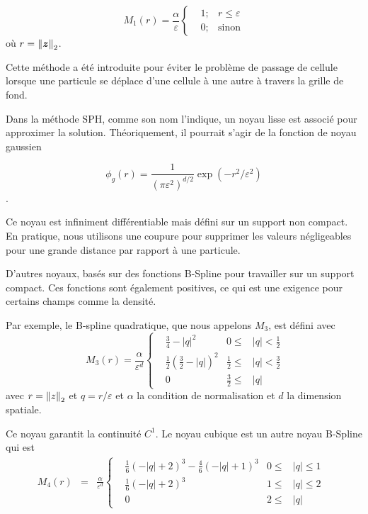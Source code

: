 \begin{equation*}
    M_1(r) = \frac{\alpha}{\varepsilon}\left\{\begin{aligned}
         & 1; & r \leq \varepsilon \\
         & 0; & \text{sinon}
    \end{aligned}
    \right.
\end{equation*}où $r = \left\lVert \bm{z} \right\rVert_2$.

Cette méthode a été introduite pour éviter le problème de passage de cellule lorsque une particule se déplace d'une cellule à une autre à travers la grille de fond.

Dans la méthode SPH, comme son nom l'indique, un noyau lisse est associé pour approximer la solution. Théoriquement, il pourrait s'agir de la fonction de noyau gaussien

\begin{equation*}
    \phi_g(r) = \frac{1}{{(\pi \varepsilon^2)}^{d/2}} \exp(-r^2/\varepsilon^2)
\end{equation*}.

Ce noyau est infiniment différentiable mais défini sur un support non compact. En pratique, nous utilisons une coupure pour supprimer les valeurs négligeables pour une grande distance par rapport à une particule.

D'autres noyaux, basés sur des fonctions B-Spline pour travailler sur un support compact. Ces fonctions sont également positives, ce qui est une exigence pour certains champs comme la densité.

Par exemple, le B-spline quadratique, que nous appelons $M_3$, est défini avec
\begin{equation}~\label{quadratic_kernel}
    M_3(r) = \frac{\alpha}{\varepsilon^d}\left\{ \begin{aligned}
         & \frac{3}{4} - |q|^2                            & 0 \leq           & |q| < \frac{1}{2} \\
         & \frac{1}{2} {\left(\frac{3}{2} - |q|\right)}^2 & \frac{1}{2} \leq & |q| < \frac{3}{2} \\
         & 0                                              & \frac{3}{2} \leq & |q|
    \end{aligned}
    \right.
\end{equation}avec $r = \left\lVert z \right\rVert_2 $ et $q = r / \varepsilon$ et $\alpha$ la condition de normalisation et $d$ la dimension spatiale.

Ce noyau garantit la continuité $C^1$.
Le noyau cubique est un autre noyau B-Spline qui est
\begin{eqnarray}~\label{cubic_kernel}
    M_4(r) &=&  \frac{\alpha}{\varepsilon^d} \left\{ \begin{aligned}
         & \frac{1}{6}{(-|q|+2)}^3 - \frac{4}{6}{(-|q|+1)}^3 & 0 \leq      & |q| \leq  1 & \\
         & \frac{1}{6}{(- |q|+2)}^3                          & 1      \leq & |q| \leq 2  & \\
         & 0                                                 & 2 \leq      & |q|
    \end{aligned}
    \right.
\end{eqnarray}

